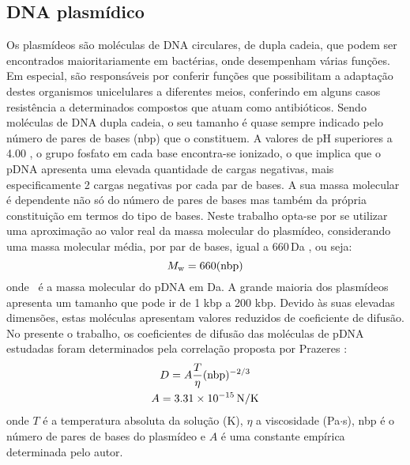\subsection{DNA plasmídico} %
\label{sub:pdna_pra}
Os plasmídeos são moléculas de DNA circulares, de dupla cadeia, que podem ser encontrados maioritariamente em bactérias, onde desempenham várias funções. Em especial, são responsáveis por conferir funções que possibilitam a adaptação destes organismos unicelulares a diferentes meios, conferindo em alguns casos resistência a determinados compostos que atuam como antibióticos. Sendo moléculas de DNA dupla cadeia, o seu tamanho é quase sempre indicado pelo número de pares de bases (nbp) que o constituem. A valores de pH superiores a 4.00 \cite{schleef}, o grupo fosfato em cada base encontra-se ionizado, o que implica que o pDNA apresenta uma elevada quantidade de cargas negativas, mais especificamente 2 cargas negativas por cada par de bases. A sua massa molecular é dependente não só do número de pares de bases mas também da própria constituição em termos do tipo de bases. Neste trabalho opta-se por se utilizar uma aproximação ao valor real da massa molecular do plasmídeo, considerando uma massa molecular média, por par de bases, igual a 660\,Da \cite{prazeresdif}, ou seja:
\begin{equation}
\label{eq:mw_pdna_pra}
M_\mathrm{w} = 660 (\mathrm{nbp})
\end{equation}
onde \massamolecular\ é a massa molecular do pDNA em Da. A grande maioria dos plasmídeos apresenta um tamanho que pode ir de 1 kbp a 200 kbp. Devido às suas elevadas dimensões, estas moléculas apresentam valores reduzidos de coeficiente de difusão. No presente o trabalho, os coeficientes de difusão das moléculas de pDNA estudadas foram determinados pela correlação proposta por Prazeres \cite{prazeresdif}:
\begin{equation}
\label{eq:prazeres_dif_pra}
\begin{gathered}
	D = A\frac{T}{\eta}(\mathrm{nbp})^{-2/3} \\
	A = 3.31 \times 10^{-15}\, \mathrm{N}/\mathrm{K}
\end{gathered}
\end{equation}
onde $T$ é a temperatura absoluta da solução (K), $\eta$ a viscosidade (Pa$\cdot$s), nbp é o número de pares de bases do plasmídeo e $A$ é uma constante empírica determinada pelo autor.

